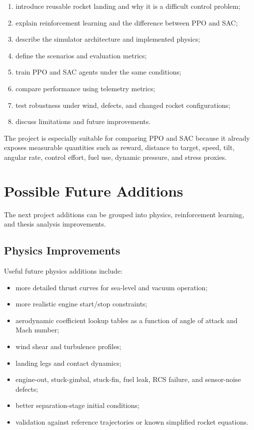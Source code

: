 \documentclass[12pt,a4paper]{article}
\begin{document}
\begin{enumerate}
    \item introduce reusable rocket landing and why it is a difficult control problem;
    \item explain reinforcement learning and the difference between PPO and SAC;
    \item describe the simulator architecture and implemented physics;
    \item define the scenarios and evaluation metrics;
    \item train PPO and SAC agents under the same conditions;
    \item compare performance using telemetry metrics;
    \item test robustness under wind, defects, and changed rocket configurations;
    \item discuss limitations and future improvements.
\end{enumerate}

The project is especially suitable for comparing PPO and SAC because it already exposes measurable quantities such as reward, distance to target, speed, tilt, angular rate, control effort, fuel use, dynamic pressure, and stress proxies.

\section{Possible Future Additions}

The next project additions can be grouped into physics, reinforcement learning, and thesis analysis improvements.

\subsection{Physics Improvements}

Useful future physics additions include:

\begin{itemize}
    \item more detailed thrust curves for sea-level and vacuum operation;
    \item more realistic engine start/stop constraints;
    \item aerodynamic coefficient lookup tables as a function of angle of attack and Mach number;
    \item wind shear and turbulence profiles;
    \item landing legs and contact dynamics;
    \item engine-out, stuck-gimbal, stuck-fin, fuel leak, RCS failure, and sensor-noise defects;
    \item better separation-stage initial conditions;
    \item validation against reference trajectories or known simplified rocket equations.
\end{itemize}
\end{document}
